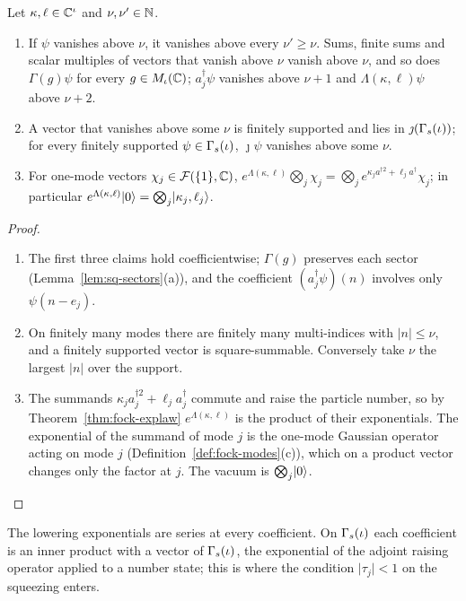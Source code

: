 \begin{veteenv}
\begin{lemma}\label{lem:dsq-above}
Let $\kappa,\ell\in\mathbb C^\iota$ and $\nu,\nu'\in\mathbb N$.
\begin{enumerate}
\item[(a)] If $\psi$ vanishes above $\nu$, it vanishes above every $\nu'\ge\nu$. Sums, finite sums and scalar multiples of
vectors that vanish above $\nu$ vanish above $\nu$, and so does $\Gamma(g)\psi$ for every $g\in M_\iota(\mathbb C)$; $a_j^\dagger\psi$
vanishes above $\nu+1$ and $\Lambda(\kappa,\ell)\psi$ above $\nu+2$.
\item[(b)] A vector that vanishes above some $\nu$ is finitely supported and lies in $\jmath(\Gamma_s(\iota))$; for every finitely
supported $\psi\in\Gamma_s(\iota)$, $\jmath\psi$ vanishes above some $\nu$.
\item[(c)] For one-mode vectors $\chi_j\in\mathcal F(\{1\},\mathbb C)$, $e^{\Lambda(\kappa,\ell)}\bigotimes_j\chi_j=\bigotimes_je^{\kappa_ja^{\dagger2}+\ell_j
a^\dagger}\chi_j$; in particular $e^{\Lambda(\kappa,\ell)}\lvert 0\rangle=\bigotimes_j\lvert \kappa_j,\ell_j\rangle$.
\end{enumerate}
\end{lemma}

\begin{proof}
\begin{enumerate}
\item[(a)] The first three claims hold coefficientwise; $\Gamma(g)$ preserves each sector (Lemma~\ref{lem:sq-sectors}(a)),
and the coefficient $(a_j^\dagger\psi)(n)$ involves only $\psi(n-e_j)$.
\item[(b)] On finitely many modes there are finitely many multi-indices with $\lvert n\rvert\le\nu$, and a finitely supported
vector is square-summable. Conversely take $\nu$ the largest $\lvert n\rvert$ over the support.
\item[(c)] The summands $\kappa_ja_j^{\dagger2}+\ell_ja_j^\dagger$ commute and raise the particle number, so by
Theorem~\ref{thm:fock-explaw} $e^{\Lambda(\kappa,\ell)}$ is the product of their exponentials. The exponential of the
summand of mode $j$ is the one-mode Gaussian operator acting on mode $j$ (Definition~\ref{def:fock-modes}(c)), which on a
product vector changes only the factor at $j$. The vacuum is $\bigotimes_j\lvert 0\rangle$.\qedhere
\end{enumerate}
\end{proof}

The lowering exponentials are series at every coefficient. On $\Gamma_s(\iota)$ each coefficient is an inner product with a vector
of $\Gamma_s(\iota)$, the exponential of the adjoint raising operator applied to a number state; this is where the condition
$\lvert\tau_j\rvert<1$ on the squeezing enters.


\end{veteenv}
